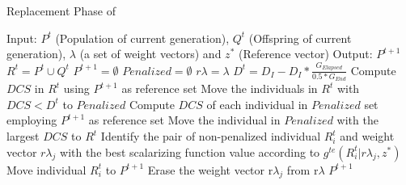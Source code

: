 \begin{algorithm}[t]
        \caption{Replacement Phase of \AVSDMOEAD{}}
\begin{small}
\begin{algorithmic}[1]
\STATE Input: $P^t$ (Population of current generation), $Q^t$ (Offspring of current generation), $\lambda$ (a set of weight vectors) and $z^*$ (Reference vector)
        \STATE Output: $P^{t+1}$
        \STATE $R^t = P^t \cup Q^t$\label{alg_2:1} 
        \STATE $P^{t+1} = \emptyset$ \label{alg_2:2}
        \STATE $Penalized = \emptyset$ \label{alg_2:3}
				\STATE $r\lambda = \lambda$
        \STATE $D^t = D_I - D_I * \frac{G_{Elapsed}}{0.5*G_{End}}$ \label{alg_2:5} 
         \label{alg_2:6}
            \STATE Compute $DCS$ in $R^t$ using $P^{t+1}$ as reference set \label{alg_2:7}
            \STATE Move the individuals in $R^t$ with $DCS < D^t$ to $Penalized$ \label{alg_2:8}
                 \label{alg_2:9}
                    \STATE Compute $DCS$ of each individual in $Penalized$ set employing $P^{t+1}$ as reference set \label{alg_2:10}
                    \STATE Move the individual in $Penalized$ with the largest $DCS$ to $R^t$ \label{alg_2:11}
                \ENDIF \label{alg_2:12}
            \STATE Identify the pair of non-penalized individual $R_i^t$ and weight vector $r\lambda_j$ with the best scalarizing function value according to $g^{te}(R_i^t | r\lambda_j, z^*)$ \label{alg_2:13}
	    \STATE Move individual $R_i^t$ to $P^{t+1}$ \label{alg_2:14}
            \STATE Erase the weight vector r$\lambda_j$ from r$\lambda$ \label{alg_2:15}
        \ENDWHILE \label{alg_2:16}
        \RETURN $P^{t+1}$ \label{alg_2:17}
        \end{algorithmic}
\end{small}
\label{alg:replacement}
\end{algorithm}



